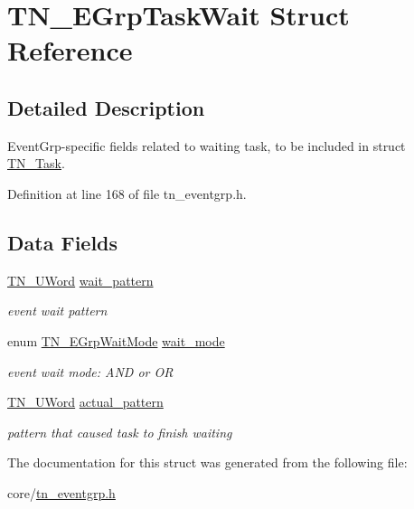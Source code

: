 \hypertarget{structTN__EGrpTaskWait}{\section{T\+N\+\_\+\+E\+Grp\+Task\+Wait Struct Reference}
\label{structTN__EGrpTaskWait}
}


\subsection{Detailed Description}
Event\+Grp-\/specific fields related to waiting task, to be included in struct \hyperlink{structTN__Task}{T\+N\+\_\+\+Task}. 

Definition at line 168 of file tn\+\_\+eventgrp.\+h.

\subsection*{Data Fields}
\begin{DoxyCompactItemize}
\item 
\hypertarget{structTN__EGrpTaskWait_a9e35b117bbf6c8ed435bf08b7ca875b3}{\hyperlink{tn__arch__example_8h_ab80cba0fe9ffcd9011d53dfeb9e39bf4}{T\+N\+\_\+\+U\+Word} \hyperlink{structTN__EGrpTaskWait_a9e35b117bbf6c8ed435bf08b7ca875b3}{wait\+\_\+pattern}}\label{structTN__EGrpTaskWait_a9e35b117bbf6c8ed435bf08b7ca875b3}

\begin{DoxyCompactList}\small\item\em event wait pattern \end{DoxyCompactList}\item 
\hypertarget{structTN__EGrpTaskWait_a0f62cf02ae71ab6a79b01f28f48854f8}{enum \hyperlink{tn__eventgrp_8h_a9d42ee61ae8da342f1cd6440b7e54bbd}{T\+N\+\_\+\+E\+Grp\+Wait\+Mode} \hyperlink{structTN__EGrpTaskWait_a0f62cf02ae71ab6a79b01f28f48854f8}{wait\+\_\+mode}}\label{structTN__EGrpTaskWait_a0f62cf02ae71ab6a79b01f28f48854f8}

\begin{DoxyCompactList}\small\item\em event wait mode\+: {\ttfamily A\+N\+D} or {\ttfamily O\+R} \end{DoxyCompactList}\item 
\hypertarget{structTN__EGrpTaskWait_ab0dd157cd06693b45a73a4b82ad713e8}{\hyperlink{tn__arch__example_8h_ab80cba0fe9ffcd9011d53dfeb9e39bf4}{T\+N\+\_\+\+U\+Word} \hyperlink{structTN__EGrpTaskWait_ab0dd157cd06693b45a73a4b82ad713e8}{actual\+\_\+pattern}}\label{structTN__EGrpTaskWait_ab0dd157cd06693b45a73a4b82ad713e8}

\begin{DoxyCompactList}\small\item\em pattern that caused task to finish waiting \end{DoxyCompactList}\end{DoxyCompactItemize}


The documentation for this struct was generated from the following file\+:\begin{DoxyCompactItemize}
\item 
core/\hyperlink{tn__eventgrp_8h}{tn\+\_\+eventgrp.\+h}\end{DoxyCompactItemize}
